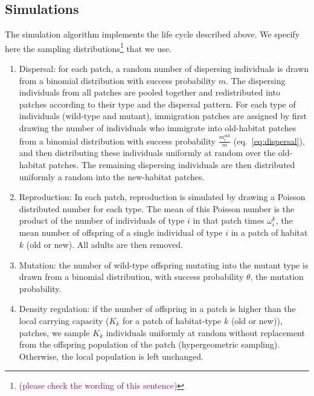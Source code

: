 \documentclass[11pt]{article}
\newcommand{\florence}[1]{\textcolor{purple}{(#1)}} %
\begin{document}
\subsection*{Simulations}
The simulation algorithm implements the life cycle described above. We specify here the sampling distributions\footnote{\florence{please check the wording of this sentence}} that we use. 
\begin{enumerate}[label = (\roman*)]
	\item Dispersal: for each patch, a random number of dispersing individuals is drawn from a binomial distribution with success probability $m$.  %
	The dispersing individuals from all patches are pooled together and redistributed into patches according to their type and the dispersal pattern.  For each type of individuals (wild-type and mutant), immigration patches are assigned by first drawing the number of individuals who immigrate into old-habitat patches from a binomial distribution with success probability $\frac{m_i^{\text{old}}}{m}$ (eq.~\eqref{eq:dispersal}), and then distributing these individuals uniformly at random over the old-habitat patches. The remaining dispersing individuals are then distributed uniformly a random into the new-habitat patches. 
	\item Reproduction: In each patch, reproduction is simulated by drawing a Poisson distributed number for each type. The mean of this Poisson number is the product of the number of individuals of type $i$ in that patch times $\omega_i^k$, the mean number of offspring of a single individual of type $i$ in a patch of habitat $k$ (old or new). 
	All adults are then removed. 
	\item Mutation: the number of wild-type offspring mutating into the mutant type is drawn from a binomial distribution, with success probability $\theta$, the mutation probability. 
	\item Density regulation: if the number of offspring in a patch is higher than the local carrying capacity ($K_k$ for a patch of habitat-type $k$ (old or new)), patches, we sample $K_k$ individuals uniformly at random without replacement from the offspring population of the patch (hypergeometric sampling). Otherwise, the local population is left unchanged. 
\end{enumerate}	
\end{document}
